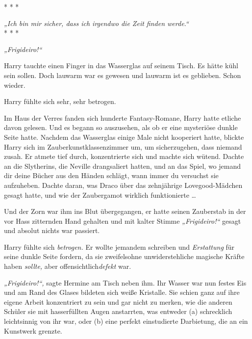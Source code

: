 

\hypertarget{gewissenhaftigkeit}{%

* * *

\emph{„Ich bin mir sicher, dass ich irgendwo die Zeit finden werde.“}\\

* * *

\emph{„Frigideiro!“}

Harry tauchte einen Finger in das Wasserglas auf seinem Tisch. Es hätte kühl sein sollen. Doch lauwarm war es gewesen und lauwarm ist es geblieben. Schon wieder.

Harry fühlte sich sehr, sehr betrogen.

Im Haus der Verres fanden sich hunderte Fantasy-Romane, Harry hatte etliche davon gelesen. Und es begann so auszusehen, als ob er eine mysteriöse dunkle Seite hatte. Nachdem das Wasserglas einige Male nicht kooperiert hatte, blickte Harry sich im Zauberkunstklassenzimmer um, um sicherzugehen, dass niemand zusah. Er atmete tief durch, konzentrierte sich und machte sich wütend. Dachte an die Slytherins, die Neville drangsaliert hatten, und an das Spiel, wo jemand dir deine Bücher aus den Händen schlägt, wann immer du versuchst sie aufzuheben. Dachte daran, was Draco über das zehnjährige Lovegood-Mädchen gesagt hatte, und wie der Zaubergamot wirklich funktionierte …

Und der Zorn war ihm ins Blut übergegangen, er hatte seinen Zauberstab in der vor Hass zitternden Hand gehalten und mit kalter Stimme \emph{„Frigideiro!“} gesagt und absolut nichts war passiert.

Harry fühlte sich \emph{betrogen.} Er wollte jemandem schreiben und \emph{Erstattung} für seine dunkle Seite fordern, da sie zweifelsohne unwiderstehliche magische Kräfte haben \emph{sollte,} aber offensichtlich\emph{defekt} war.

\emph{„Frigideiro!“,} sagte Hermine am Tisch neben ihm. Ihr Wasser war nun festes Eis und am Rand des Glases bildeten sich weiße Kristalle. Sie schien ganz auf ihre eigene Arbeit konzentriert zu sein und gar nicht zu merken, wie die anderen Schüler sie mit hasserfüllten Augen anstarrten, was entweder (a) schrecklich leichtsinnig von ihr war, oder (b) eine perfekt einstudierte Darbietung, die an ein Kunstwerk grenzte.

}
